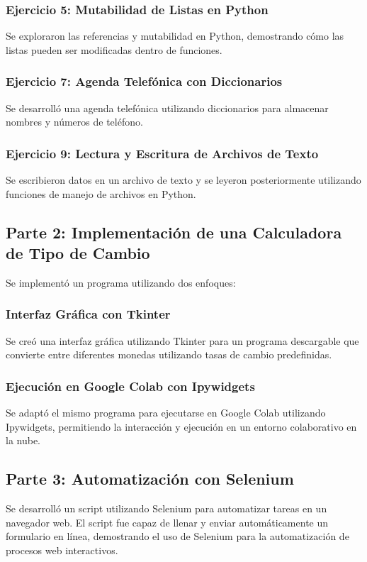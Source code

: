 \documentclass[twocolumn]{article}
\begin{document}
\subsubsection*{Ejercicio 5: Mutabilidad de Listas en Python}
Se exploraron las referencias y mutabilidad en Python, demostrando cómo las listas pueden ser modificadas dentro de funciones.

\subsubsection*{Ejercicio 7: Agenda Telefónica con Diccionarios}
Se desarrolló una agenda telefónica utilizando diccionarios para almacenar nombres y números de teléfono.

\subsubsection*{Ejercicio 9: Lectura y Escritura de Archivos de Texto}
Se escribieron datos en un archivo de texto y se leyeron posteriormente utilizando funciones de manejo de archivos en Python.

\subsection*{Parte 2: Implementación de una Calculadora de Tipo de Cambio}
Se implementó un programa utilizando dos enfoques:

\subsubsection*{Interfaz Gráfica con Tkinter}
Se creó una interfaz gráfica utilizando Tkinter para un programa descargable que convierte entre diferentes monedas utilizando tasas de cambio predefinidas.

\subsubsection*{Ejecución en Google Colab con Ipywidgets}
Se adaptó el mismo programa para ejecutarse en Google Colab utilizando Ipywidgets, permitiendo la interacción y ejecución en un entorno colaborativo en la nube.

\subsection*{Parte 3: Automatización con Selenium}
Se desarrolló un script utilizando Selenium para automatizar tareas en un navegador web. El script fue capaz de llenar y enviar automáticamente un formulario en línea, demostrando el uso de Selenium para la automatización de procesos web interactivos.
\end{document}
